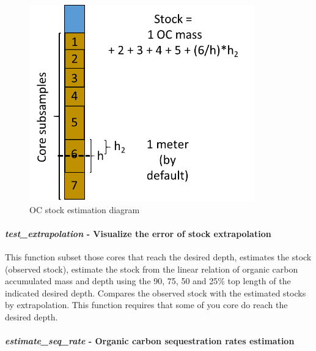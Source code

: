 \documentclass[10pt,a4paper,onecolumn]{article}
\let\oldparagraph\paragraph
\renewcommand{\paragraph}[1]{\oldparagraph{#1}\mbox{}}
\begin{document}
\begin{figure}
\centering
\includegraphics[width=3.83333in,height=\textheight]{images/estimate_stock.png}
\caption{OC stock estimation diagram}
\end{figure}

\hypertarget{test_extrapolation---visualize-the-error-of-stock-extrapolation}{%
\paragraph{\texorpdfstring{\textbf{\emph{test\_extrapolation}} \textbf{-
Visualize the error of stock
extrapolation}}{test\_extrapolation - Visualize the error of stock extrapolation}}\label{test_extrapolation---visualize-the-error-of-stock-extrapolation}}

This function subset those cores that reach the desired depth, estimates
the stock (observed stock), estimate the stock from the linear relation
of organic carbon accumulated mass and depth using the 90, 75, 50 and
25\% top length of the indicated desired depth. Compares the observed
stock with the estimated stocks by extrapolation. This function requires
that some of you core do reach the desired depth.

\hypertarget{estimate_seq_rate---organic-carbon-sequestration-rates-estimation}{%
\paragraph{\texorpdfstring{\textbf{\emph{estimate\_seq\_rate}} \textbf{-
Organic carbon sequestration rates
estimation}}{estimate\_seq\_rate - Organic carbon sequestration rates estimation}}\label{estimate_seq_rate---organic-carbon-sequestration-rates-estimation}}
\end{document}
